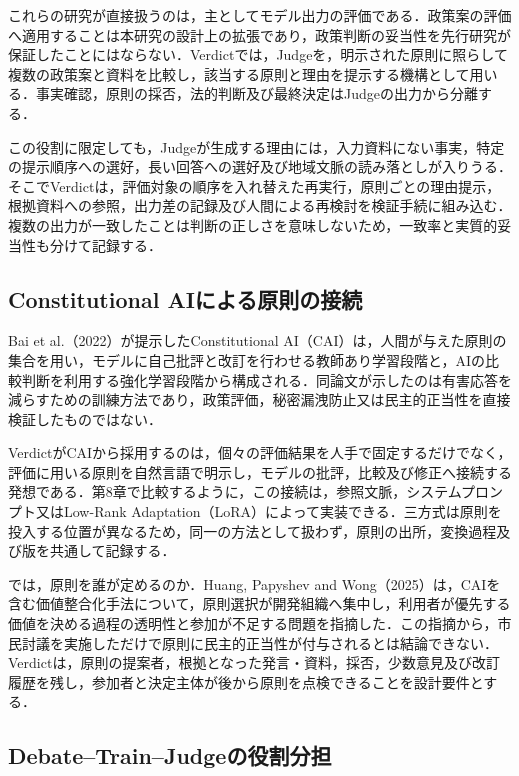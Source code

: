 これらの研究が直接扱うのは，主としてモデル出力の評価である．政策案の評価へ適用することは本研究の設計上の拡張であり，政策判断の妥当性を先行研究が保証したことにはならない．Verdictでは，Judgeを，明示された原則に照らして複数の政策案と資料を比較し，該当する原則と理由を提示する機構として用いる．事実確認，原則の採否，法的判断及び最終決定はJudgeの出力から分離する．

この役割に限定しても，Judgeが生成する理由には，入力資料にない事実，特定の提示順序への選好，長い回答への選好及び地域文脈の読み落としが入りうる．そこでVerdictは，評価対象の順序を入れ替えた再実行，原則ごとの理由提示，根拠資料への参照，出力差の記録及び人間による再検討を検証手続に組み込む．複数の出力が一致したことは判断の正しさを意味しないため，一致率と実質的妥当性も分けて記録する．

\subsection{Constitutional AIによる原則の接続}

Bai et al.（2022）が提示したConstitutional AI（CAI）は，人間が与えた原則の集合を用い，モデルに自己批評と改訂を行わせる教師あり学習段階と，AIの比較判断を利用する強化学習段階から構成される\cite{bai2022constitutional}．同論文が示したのは有害応答を減らすための訓練方法であり，政策評価，秘密漏洩防止又は民主的正当性を直接検証したものではない．

VerdictがCAIから採用するのは，個々の評価結果を人手で固定するだけでなく，評価に用いる原則を自然言語で明示し，モデルの批評，比較及び修正へ接続する発想である．第8章で比較するように，この接続は，参照文脈，システムプロンプト又はLow-Rank Adaptation（LoRA）によって実装できる．三方式は原則を投入する位置が異なるため，同一の方法として扱わず，原則の出所，変換過程及び版を共通して記録する．

では，原則を誰が定めるのか．Huang, Papyshev and Wong（2025）は，CAIを含む価値整合化手法について，原則選択が開発組織へ集中し，利用者が優先する価値を決める過程の透明性と参加が不足する問題を指摘した\cite{huang2025democratizing}．この指摘から，市民討議を実施しただけで原則に民主的正当性が付与されるとは結論できない．Verdictは，原則の提案者，根拠となった発言・資料，採否，少数意見及び改訂履歴を残し，参加者と決定主体が後から原則を点検できることを設計要件とする．

\subsection{Debate--Train--Judgeの役割分担}

